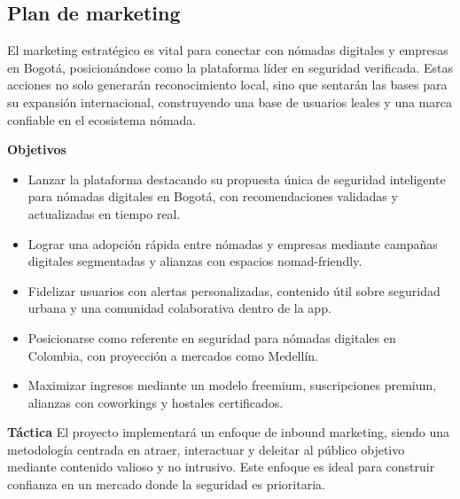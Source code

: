 \subsection*{Plan de marketing}
El marketing estratégico es vital para conectar con nómadas digitales y empresas en Bogotá, posicionándose como la plataforma líder en seguridad verificada. Estas acciones no solo generarán reconocimiento local, sino que sentarán las bases para su expansión internacional, construyendo una base de usuarios leales y una marca confiable en el ecosistema nómada.

\textbf{Objetivos}
\begin{itemize}
    \item Lanzar la plataforma destacando su propuesta única de seguridad inteligente para nómadas digitales en Bogotá, con recomendaciones validadas y actualizadas en tiempo real.
    \item Lograr una adopción rápida entre nómadas y empresas mediante campañas digitales segmentadas y alianzas con espacios nomad-friendly.
    \item Fidelizar usuarios con alertas personalizadas, contenido útil sobre seguridad urbana y una comunidad colaborativa dentro de la app.
    \item Posicionarse como referente en seguridad para nómadas digitales en Colombia, con proyección a mercados como Medellín.
    \item Maximizar ingresos mediante un modelo freemium, suscripciones premium, alianzas con coworkings y hostales certificados.
\end{itemize}

\textbf{Táctica}
El proyecto implementará un enfoque de inbound marketing, siendo una metodología centrada en atraer, interactuar y deleitar al público objetivo mediante contenido valioso y no intrusivo. Este enfoque es ideal para construir confianza en un mercado donde la seguridad es prioritaria.

